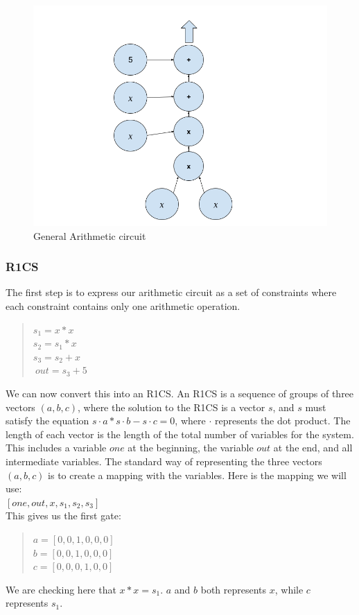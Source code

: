 \begin{figure}[H]
\centering
\includegraphics[width=130mm]{ArithmeticCircuit.png}
\caption{General Arithmetic circuit}
\label{overflow}
\end{figure}

\subsubsection{R1CS}
\label{subsec:r1cs}
The first step is to express our arithmetic circuit as a set of constraints where each constraint contains only one arithmetic operation.
\begin{quote}
$s_1 = x * x$
\\
$s_2 = s_1 * x$
\\
$s_3 = s_2 + x$
\\
$~out = s_3 + 5$
\end{quote}

We can now convert this into an R1CS.
An R1CS is a sequence of groups of three vectors $(a, b, c)$, where the solution to the R1CS is a vector $s$, and $s$ must satisfy the equation $s \cdot a * s \cdot b - s \cdot c = 0$, where $\cdot$ represents the dot product.
The length of each vector is the length of the total number of variables for the system. This includes a variable $one$ at the beginning, the variable $out$ at the end, and all intermediate variables.
The standard way of representing the three vectors $(a, b, c)$ is to create a mapping with the variables.
Here is the mapping we will use:
\\ 
$[one,out,x,s_1,s_2,s_3]$
\\
This gives us the first gate:
\begin{quote}
   $a = [0,0,1,0,0,0]$
   \\
   $b = [0,0,1,0,0,0]$
   \\
   $c = [0,0,0,1,0,0]$
\end{quote}
We are checking here that $x*x=s_1$.
$a$ and $b$ both represents $x$, while $c$ represents $s_1$.

